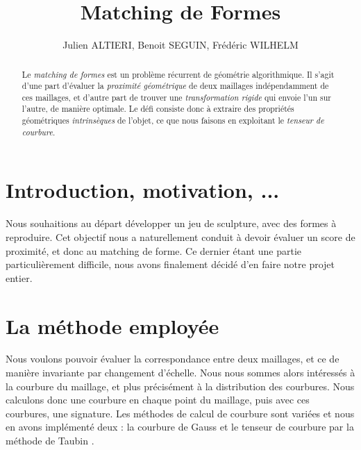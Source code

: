 \documentclass{llncs}
\begin{document}
\title{Matching de Formes}

\author{Julien ALTIERI, Benoit SEGUIN, Frédéric WILHELM}

\maketitle

\begin{abstract}
Le \textit{matching de formes} est un probl\`eme r\'ecurrent de g\'eom\'etrie algorithmique. Il s'agit d'une part d'\'evaluer la \textit{proximit\'e g\'eom\'etrique} de deux maillages ind\'ependamment de ces maillages, et d'autre part de trouver une \textit{transformation rigide} qui envoie l'un sur l'autre, de mani\`ere optimale. Le d\'efi consiste donc à extraire des propri\'et\'es g\'eom\'etriques \textit{intrins\`eques} de l'objet, ce que nous faisons en exploitant le \textit{tenseur de courbure}.
\end{abstract}

\section{Introduction, motivation, ...}
Nous souhaitions au d\'epart d\'evelopper un jeu de sculpture, avec des formes \`a reproduire. Cet objectif nous a naturellement conduit \`a devoir \'evaluer un score de proximit\'e, et donc au matching de forme. Ce dernier étant une partie particulièrement difficile, nous avons finalement décidé d'en faire notre projet entier.


\section{La m\'ethode employ\'ee}

Nous voulons pouvoir évaluer la correspondance entre deux maillages, et ce de manière invariante par changement d'échelle. Nous nous sommes alors intéressés à la courbure du maillage, et plus précisément à la distribution des courbures. Nous calculons donc une courbure en chaque point du maillage, puis avec ces courbures, une signature. Les méthodes de calcul de courbure sont variées et nous en avons implémenté deux : la courbure de Gauss \cite{rugis} et le tenseur de courbure par la méthode de Taubin \cite{taubin}.
\end{document}
